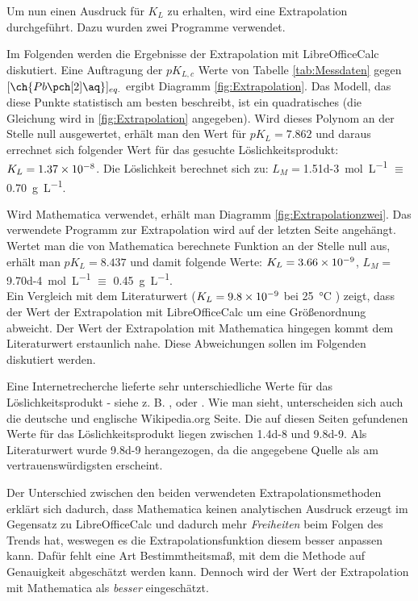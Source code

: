 \documentclass{article}
\begin{document}
    Um nun einen Ausdruck für $K_{L}$ zu erhalten, wird eine Extrapolation durchgeführt. Dazu wurden zwei Programme verwendet. 
    
    Im Folgenden werden die Ergebnisse der Extrapolation mit LibreOfficeCalc \cite{LibreOffice} diskutiert. Eine Auftragung der $pK_{L,c}$ Werte von Tabelle \ref{tab:Messdaten} gegen $[\ch{Pb\pch[2]\aq}]_{eq.}$ ergibt Diagramm \ref{fig:Extrapolation}. Das Modell, das diese Punkte statistisch am besten beschreibt, ist ein quadratisches (die Gleichung wird in \ref{fig:Extrapolation} angegeben). Wird dieses Polynom an der Stelle null ausgewertet, erhält man den Wert für $pK_{L}=7.862$ und daraus errechnet sich folgender Wert für das gesuchte Löslichkeitsprodukt: $K_{L}=\num{1.37d-8}$. Die Löslichkeit berechnet sich zu: $L_{M} = $\SI[mode=text, separate-uncertainty]{1.51d-3}{\mole\per\liter} $\equiv$ \SI[mode=text, separate-uncertainty]{0.70}{\gram\per\liter}. 
    
    Wird Mathematica \cite{Mathematica} verwendet, erhält man Diagramm \ref{fig:Extrapolationzwei}. Das verwendete Programm zur Extrapolation wird auf der letzten Seite angehängt. Wertet man die von Mathematica berechnete Funktion an der Stelle null aus, erhält man $pK_{L}=8.437$ und damit folgende Werte: $K_{L}=\num{3.66d-9}$, $L_{M} = $\SI[mode=text, separate-uncertainty]{9.70d-4}{\mole\per\liter} $\equiv$ \SI[mode=text, separate-uncertainty]{0.45}{\gram\per\liter}. \\
    
    Ein Vergleich mit dem Literaturwert ($K_{L}=\num{9.8d-9}$ bei \SI[mode=text]{25}{\degreeCelsius} \cite[S. 8-819]{solubilityConstants}) zeigt, dass der Wert der Extrapolation mit LibreOfficeCalc um eine Größenordnung abweicht. Der Wert der Extrapolation mit Mathematica hingegen kommt dem Literaturwert erstaunlich nahe. Diese Abweichungen sollen im Folgenden diskutiert werden. 
    
    Eine Internetrecherche lieferte sehr unterschiedliche Werte für das Löslichkeitsprodukt - siehe z. B. \cite{solubitliyWikizwei}, \cite{solubilityWikipedia} oder \cite{solubilityOtherOne}. Wie man sieht, unterscheiden sich auch die deutsche und englische Wikipedia.org Seite. Die auf diesen Seiten gefundenen Werte für das Löslichkeitsprodukt liegen zwischen \num{1.4d-8} und \num{9.8d-9}. Als Literaturwert wurde \num{9.8d-9} herangezogen, da die angegebene Quelle als am vertrauenswürdigsten erscheint. 
    
    Der Unterschied zwischen den beiden verwendeten Extrapolationsmethoden erklärt sich dadurch, dass Mathematica keinen analytischen Ausdruck erzeugt im Gegensatz zu LibreOfficeCalc und dadurch mehr \textit{Freiheiten} beim Folgen des Trends hat, weswegen es die Extrapolationsfunktion diesem besser anpassen kann. Dafür fehlt eine Art Bestimmtheitsmaß, mit dem die Methode auf Genauigkeit abgeschätzt werden kann. Dennoch wird der Wert der Extrapolation mit Mathematica als \textit{besser} eingeschätzt. \\
    
\end{document}

